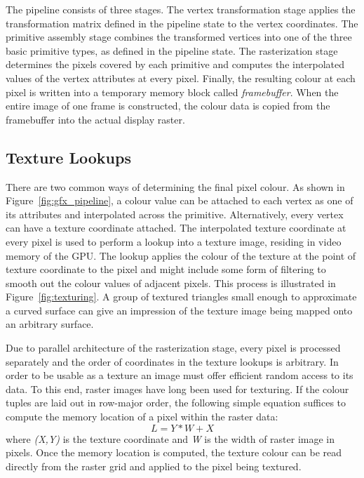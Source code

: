 \documentclass[11pt,a4paper,twoside]{article}
\begin{document}
The pipeline consists of three stages. The vertex transformation stage applies the transformation matrix defined in the pipeline state to the vertex coordinates. The primitive assembly stage combines the transformed vertices into one of the three basic primitive types, as defined in the pipeline state. The rasterization stage determines the pixels covered by each primitive and computes the interpolated values of the vertex attributes at every pixel. Finally, the resulting colour at each pixel is written into a temporary memory block called \emph{framebuffer}. When the entire image of one frame is constructed, the colour data is copied from the framebuffer into the actual display raster.

\subsection{Texture Lookups}

There are two common ways of determining the final pixel colour. As shown in Figure~\ref{fig:gfx_pipeline}, a colour value can be attached to each vertex as one of its attributes and interpolated across the primitive. Alternatively, every vertex can have a texture coordinate attached. The interpolated texture coordinate at every pixel is used to perform a lookup into a texture image, residing in video memory of the GPU. The lookup applies the colour of the texture at the point of texture coordinate to the pixel and might include some form of filtering to smooth out the colour values of adjacent pixels. This process is illustrated in Figure~\ref{fig:texturing}. A group of textured triangles small enough to approximate a curved surface can give an impression of the texture image being mapped onto an arbitrary surface.

Due to parallel architecture of the rasterization stage, every pixel is processed separately and the order of coordinates in the texture lookups is arbitrary. In order to be usable as a texture an image must offer efficient random access to its data. To this end, raster images have long been used for texturing. If the colour tuples are laid out in row-major order, the following simple equation suffices to compute the memory location of a pixel within the raster data:
\[ L = Y * W + X \]
where \emph{(X,Y)} is the texture coordinate and \emph{W} is the width of raster image in pixels. Once the memory location is computed, the texture colour can be read directly from the raster grid and applied to the pixel being textured.
\end{document}
